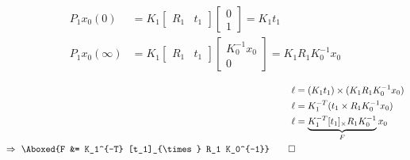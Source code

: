 \documentclass{article}
\begin{document}
\begin{equation}
\begin{alignedat}{2}
P_1 x_0(0) &= K_1 \begin{bmatrix}
R_1 & t_1
\end{bmatrix} \begin{bmatrix}
0 \\ 1
\end{bmatrix} = K_1 t_1 \\
P_1 x_0(\infty) &= K_1 \begin{bmatrix}
R_1 & t_1
\end{bmatrix} \begin{bmatrix}
K_0^{-1} x_0 \\ 0
\end{bmatrix} = K_1 R_1 K_0^{-1} x_0
\end{alignedat} \label{eq:e4}
\end{equation}
    
\begin{alignat}{2}
\ell &= (K_1 t_1) \times (K_1 R_1 K_0^{-1} x_0) \label{eq:e5} \\
\nonumber
\ell &= K_1^{-T} (t_1 \times R_1 K_0^{-1} x_0) \\
\nonumber
\ell &= \underbrace{K_1^{-T} [t_1]_{\times} R_1 K_0^{-1}}_{F} x_0 \\
\Rightarrow ~ \Aboxed{F &= K_1^{-T} [t_1]_{\times} R_1 K_0^{-1}} \qed \label{eq:e6}
\end{alignat}







\end{document}

